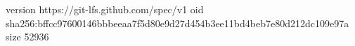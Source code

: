 version https://git-lfs.github.com/spec/v1
oid sha256:bffcc97600146bbbeeaa7f5d80e9d27d454b3ee11bd4beb7e80d212dc109e97a
size 52936
